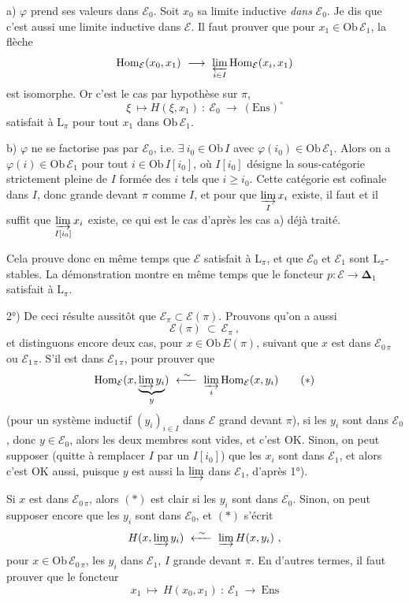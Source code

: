\documentclass[11pt]{article}
\newcommand{\msp}[1]{\marginpar{\footnotesize [#1]}}
\newcommand{\bDelta}{\boldsymbol{\Delta}}
\newcommand{\Ens}{\mathrm{Ens}}
\newcommand{\Ob}{\mathrm{Ob}\,}
\newcommand{\Hom}{\mathrm{Hom}}
\begin{document}
a) $\varphi$ prend ses valeurs dans $\mathcal{E}_0$. Soit $x_0$ sa limite inductive \textit{dans} $\mathcal{E}_0$. Je dis que c'est aussi une limite inductive dans $\mathcal{E}$. Il faut prouver que pour $x_1\in\Ob\mathcal{E}_1$, la flèche
\[
\Hom_{\mathcal{E}}(x_0,x_1)\ \longrightarrow\ \varprojlim_{i\in I}\Hom_{\mathcal{E}}(x_i,x_1)
\]
est isomorphe. Or c'est le cas
\msp{page 417}
par hypothèse sur $\pi$,
\[
\xi\ \longmapsto H(\xi,x_1)\ :\ \mathcal{E}_0\ \longrightarrow\ (\Ens)^{\circ}
\]
satisfait à $\mathrm{L}_\pi$ pour tout $x_1$ dans $\Ob\mathcal{E}_1$.

b) $\varphi$ ne se factorise pas par $\mathcal{E}_0$, i.e. $\exists\ i_0\in\Ob I$ avec $\varphi(i_0)\in\Ob\mathcal{E}_1$. Alors on a $\varphi(i)\in\Ob\mathcal{E}_1$ pour tout $i\in\Ob I[i_0]$, où $I[i_0]$ désigne la sous-catégorie strictement pleine de $I$ formée des $i$ tels que $i\geqslant i_0$. Cette catégorie est cofinale dans $I$, donc grande devant $\pi$ comme $I$, et pour que $\varinjlim\limits_{I}x_i$ existe, il faut et il suffit que $\varinjlim\limits_{I[i_0]}x_i$ existe, ce qui est le cas d'après les cas a) déjà traité. %

Cela prouve donc en même temps que $\mathcal{E}$ satisfait à $\mathrm{L}_\pi$, et que $\mathcal{E}_0$ et $\mathcal{E}_1$ sont $\mathrm{L}_\pi$-stables. La démonstration montre en même temps que le foncteur $p:\mathcal{E}\longrightarrow\bDelta_1$ satisfait à $\mathrm{L}_\pi$.

2°) De ceci résulte aussitôt que $\mathcal{E}_\pi\subset\mathcal{E}(\pi)$. Prouvons qu'on a aussi
\[
\mathcal{E}(\pi)\ \subset\ \mathcal{E}_\pi\ ,
\]
et distinguons encore deux cas, pour
\msp{page 418}
$x\in\Ob E(\pi)$, suivant que $x$ est dans $\mathcal{E}_{0\,\pi}$ ou $\mathcal{E}_{1\,\pi}$. S'il est dans $\mathcal{E}_{1\,\pi}$, pour prouver que %
\[
\Hom_{\mathcal{E}}(x,\underbrace{\varinjlim y_i}_{y})\ \xleftarrow{\ \sim\ }\ \varinjlim_{i}\Hom_{\mathcal{E}}(x,y_i)
\tag*{$(*)$}
\]
(pour un système inductif $(y_i)_{i\in I}$ dans $\mathcal{E}$ grand devant $\pi$), si les $y_i$ sont dans $\mathcal{E}_0$, donc $y\in\mathcal{E}_0$, alors les deux membres sont vides, et c'est OK. Sinon, on peut supposer (quitte à remplacer $I$ par un $I[i_0]$) que les $x_i$ sont dans $\mathcal{E}_1$, et alors c'est OK aussi, puisque $y$ est aussi la $\varinjlim$ dans $\mathcal{E}_1$, d'après 1°). %

Si $x$ est dans $\mathcal{E}_{0\,\pi}$, alors $(*)$ est clair si les $y_i$ sont dans $\mathcal{E}_0$. Sinon, on peut supposer encore que les $y_i$ sont dans $\mathcal{E}_0$, et $(*)$ s'écrit %
\[
H(x,\varinjlim y_i)\ \xleftarrow{\ \sim\ }\ \varinjlim H(x,y_i)\ ,
\]
pour $x\in\Ob\mathcal{E}_{0\,\pi}$, les $y_i$ dans $\mathcal{E}_1$, $I$ grande devant $\pi$. En d'autres termes, il faut prouver que le foncteur
\[
x_1\ \longmapsto\ H(x_0,x_1)\ :\ \mathcal{E}_1\ \longrightarrow\ \Ens
\]
\end{document}
